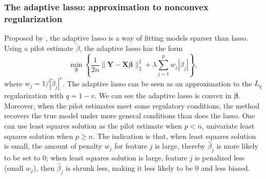 \subsubsection{The adaptive lasso: approximation to nonconvex regularization}
Proposed by \cite{zou2006adaptive}, the adaptive lasso is a way of fitting models sparser than lasso. Using a pilot estimate $\tilde{\beta}$, the adaptive lasso has the form
\begin{equation}
    \min_{\bm{\beta}} \left\{ \frac{1}{2n}\|\bm{Y}-\bm{X\beta}\|_2^2+\lambda\sum_{j=1}^pw_j|\beta_j| \right\}, \label{eq1.20}
\end{equation}
where $w_j=1/|\tilde{\beta}_j|^v$. The adaptive lasso can be seen as an approximation to the $L_q$ regularization with $q=1-v$. We can see the adaptive lasso is convex in $\bm{\beta}$. Moreover, when the pilot estimates meet some regulatory conditions, the method recovers the true model under more general conditions than does the lasso. One can use least squares solution as the pilot estimate when $p<n$, univariate least squares solution when $p\geq n$. The indication is that, when least squares solution is small, the amount of penalty $w_j$ for feature $j$ is large, thereby $\hat{\beta}_j$ is more likely to be set to 0; when least squares solution is large, feature $j$ is penalized less (small $w_j$), then $\hat{\beta}_j$ is shrunk less, making it less likely to be 0 and less biased.